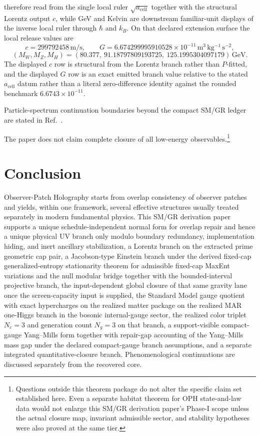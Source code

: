 \documentclass[11pt]{article}
\begin{document}
therefore read from the single local ruler \(\sqrt{a_{\mathrm{cell}}}\) together with the
structural Lorentz output \(c\), while GeV and Kelvin are downstream familiar-unit displays of the
inverse local ruler through \(\hbar\) and \(k_B\).
On that declared extension surface the local release values are
\[
c=299792458\,\mathrm{m/s},
\qquad
G=6.674299995910528\times10^{-11}\,\mathrm{m^3\,kg^{-1}\,s^{-2}},
\]
\[
(M_W,M_Z,M_H)=
(80.377,\ 91.18797809193725,\ 125.1995304097179)\,\mathrm{GeV}.
\]
The displayed \(c\) row is structural from the Lorentz branch rather than \(P\)-fitted, and the
displayed \(G\) row is an exact emitted branch value relative to the stated \(a_{\mathrm{cell}}\)
datum rather than a literal zero-difference identity against the rounded benchmark
\(6.6743\times10^{-11}\).

Particle-spectrum continuation boundaries beyond the compact SM/GR ledger are stated in Ref.~\cite{ophparticles}.

The paper does not claim complete closure of all low-energy observables.\footnote{Questions outside this theorem package do not alter the specific claim set established here. Even a separate habitat theorem for OPH state-and-law data would not enlarge this SM/GR derivation paper's Phase-I scope unless the actual closure map, invariant admissible sector, and stability hypotheses were also proved at the same tier.}
\section{Conclusion}

Observer-Patch Holography starts from overlap consistency of observer patches and yields, within one framework, several effective structures usually treated separately in modern fundamental physics. This SM/GR derivation paper supports a unique schedule-independent normal form for overlap repair and hence a unique physical UV branch only modulo boundary redundancy, implementation hiding, and inert ancillary stabilization, a Lorentz branch on the extracted prime geometric cap pair, a Jacobson-type Einstein branch under the derived fixed-cap generalized-entropy stationarity theorem for admissible fixed-cap MaxEnt variations and the null modular bridge together with the bounded-interval projective branch, the input-dependent global closure of that same gravity lane once the screen-capacity input is supplied, the Standard Model gauge quotient with exact hypercharges on the realized matter package on the realized MAR one-Higgs branch in the bosonic internal-gauge sector, the realized color triplet \(N_c=3\) and generation count \(N_g=3\) on that branch, a support-visible compact-gauge Yang--Mills form together with repair-gap accounting of the Yang--Mills mass gap under the declared compact-gauge branch assumptions, and a separate integrated quantitative-closure branch. Phenomenological continuations are discussed separately from the recovered core.
\end{document}
